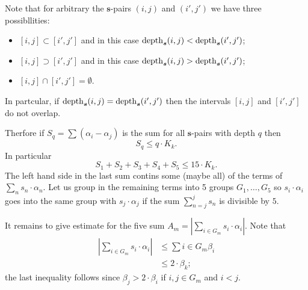 \documentclass[a4paper,10pt]{amsart}
\begin{document}
Note that for arbitrary the $\bm{s}$-pairs $(i,j)$ and $(i',j')$
we have three possibllities:
\begin{itemize}
\item $[i,j]\subset [i',j']$ and in this case $\mathop{\rm depth}\nolimits_{\bm{s}}(i,j)<\mathop{\rm depth}\nolimits_{\bm{s}}(i',j')$;
\item $[i,j]\supset [i',j']$ and in this case $\mathop{\rm depth}\nolimits_{\bm{s}}(i,j)>\mathop{\rm depth}\nolimits_{\bm{s}}(i',j')$;
\item $[i,j]\cap [i',j']=\emptyset$.
\end{itemize}
In partcular, if $\mathop{\rm depth}\nolimits_{\bm{s}}(i,j)=\mathop{\rm depth}\nolimits_{\bm{s}}(i',j')$ then the intervals $[i,j]$ and $[i',j']$ do not overlap.

Therfore if $S_q=\sum (\alpha_i-\alpha_j)$ is the sum for all $\bm{s}$-pairs with depth $q$ then 
\[S_q\le q\cdot K_k.\]
In particular 
\[S_1+S_2+S_3+S_4+S_5\le 15\cdot K_k.\]
The left hand side in the last sum contins some (maybe all) of the terms of 
$\sum_{n} s_n\cdot \alpha_n$.
Let us group in the remaining terms into 5 groups $G_1,\dots,G_5$ 
so $s_i\cdot\alpha_i$ goes into the same group with $s_j\cdot\alpha_j$
if the sum $\sum_{n=j}^j s_n$ is divisible by $5$.

It remains to give estimate for the five sum 
$A_m=|\sum_{i\in G_m}s_i\cdot \alpha_i|$.
Note that
\begin{align*}
|\sum_{i\in G_m}s_i\cdot \alpha_i|
&\le \sum {i\in G_m}\beta_i
\\
&\le 2\cdot\beta_k;
\end{align*}
the last inequality follows since
$\beta_j>2\cdot \beta_i$
if $i,j\in G_m$ and $i<j$.
\qeds
\end{document}
